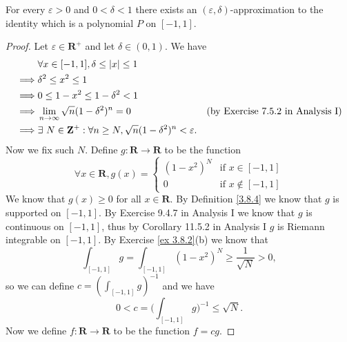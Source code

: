\begin{lemma}\label{3.8.8}
    For every \(\varepsilon > 0\) and \(0 < \delta < 1\) there exists an \((\varepsilon, \delta)\)-approximation to the identity which is a polynomial \(P\) on \([-1, 1]\).
\end{lemma}

\begin{proof}
    Let \(\varepsilon \in \mathbf{R}^+\) and let \(\delta \in (0, 1)\).
    We have
    \begin{align*}
                 & \forall x \in [-1, 1], \delta \leq \abs*{x} \leq 1                                                                                  \\
        \implies & \delta^2 \leq x^2 \leq 1                                                                                                            \\
        \implies & 0 \leq 1 - x^2 \leq 1 - \delta^2 < 1                                                                                                \\
        \implies & \lim_{n \to \infty} \sqrt{n} (1 - \delta^2)^n = 0                                        & \text{(by Exercise 7.5.2 in Analysis I)} \\
        \implies & \exists\ N \in \mathbf{Z}^+ : \forall n \geq N, \sqrt{n} (1 - \delta^2)^n < \varepsilon.
    \end{align*}
    Now we fix such \(N\).
    Define \(g : \mathbf{R} \to \mathbf{R}\) to be the function
    \[
        \forall x \in \mathbf{R}, g(x) = \begin{cases}
            (1 - x^2)^N & \text{if } x \in [-1, 1]    \\
            0           & \text{if } x \notin [-1, 1]
        \end{cases}
    \]
    We know that \(g(x) \geq 0\) for all \(x \in \mathbf{R}\).
    By Definition \ref{3.8.4} we know that \(g\) is supported on \([-1, 1]\).
    By Exercise 9.4.7 in Analysis I we know that \(g\) is continuous on \([-1, 1]\), thus by Corollary 11.5.2 in Analysis I \(g\) is Riemann integrable on \([-1, 1]\).
    By Exercise \ref{ex 3.8.2}(b) we know that
    \[
        \int_{[-1, 1]} g = \int_{[-1, 1]} (1 - x^2)^N \geq \frac{1}{\sqrt{N}} > 0,
    \]
    so we can define \(c = (\int_{[-1, 1]} g)^{-1}\) and we have
    \[
        0 < c = \bigg(\int_{[-1, 1]} g\bigg)^{-1} \leq \sqrt{N}.
    \]
    Now we define \(f : \mathbf{R} \to \mathbf{R}\) to be the function \(f = cg\).

\end{proof}
